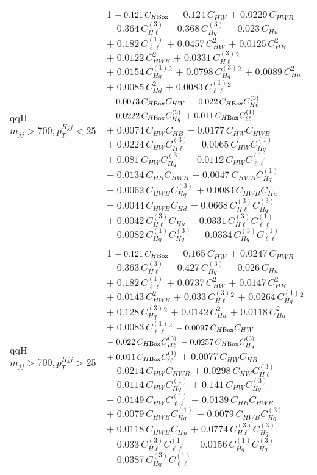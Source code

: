\begin{tabular}{l|p{}}
    qqH $m_{jj} > 700, p_{T}^{Hjj} < 25$ & 1 $+\;0.121\,C_{H\rm{Box}}$ $-\;0.124\,C_{HW}$ $+\;0.0229\,C_{HWB}$ $-\;0.364\,C^{(3)}_{H\ell}$ $-\;0.368\,C^{(3)}_{Hq}$ $-\;0.023\,C_{Hu}$ $+\;0.182\,C^{(1)}_{\ell\ell}$ $+\;0.0457\,C_{HW}^{2}$ $+\;0.0125\,C_{HB}^{2}$ $+\;0.0122\,C_{HWB}^{2}$ $+\;0.0331\,C^{(3)}_{H\ell}^{2}$ $+\;0.0154\,C^{(1)}_{Hq}^{2}$ $+\;0.0798\,C^{(3)}_{Hq}^{2}$ $+\;0.0089\,C_{Hu}^{2}$ $+\;0.0085\,C_{Hd}^{2}$ $+\;0.0083\,C^{(1)}_{\ell\ell}^{2}$ $-\;0.0073\,C_{H\rm{Box}}C_{HW}$ $-\;0.022\,C_{H\rm{Box}}C^{(3)}_{H\ell}$ $-\;0.0222\,C_{H\rm{Box}}C^{(3)}_{Hq}$ $+\;0.011\,C_{H\rm{Box}}C^{(1)}_{\ell\ell}$ $+\;0.0074\,C_{HW}C_{HB}$ $-\;0.0177\,C_{HW}C_{HWB}$ $+\;0.0224\,C_{HW}C^{(3)}_{H\ell}$ $-\;0.0065\,C_{HW}C^{(1)}_{Hq}$ $+\;0.081\,C_{HW}C^{(3)}_{Hq}$ $-\;0.0112\,C_{HW}C^{(1)}_{\ell\ell}$ $-\;0.0134\,C_{HB}C_{HWB}$ $+\;0.0047\,C_{HWB}C^{(1)}_{Hq}$ $-\;0.0062\,C_{HWB}C^{(3)}_{Hq}$ $+\;0.0083\,C_{HWB}C_{Hu}$ $-\;0.0044\,C_{HWB}C_{Hd}$ $+\;0.0668\,C^{(3)}_{H\ell}C^{(3)}_{Hq}$ $+\;0.0042\,C^{(3)}_{H\ell}C_{Hu}$ $-\;0.0331\,C^{(3)}_{H\ell}C^{(1)}_{\ell\ell}$ $-\;0.0082\,C^{(1)}_{Hq}C^{(3)}_{Hq}$ $-\;0.0334\,C^{(3)}_{Hq}C^{(1)}_{\ell\ell}$ \\
    qqH $m_{jj} > 700, p_{T}^{Hjj} > 25$ & 1 $+\;0.121\,C_{H\rm{Box}}$ $-\;0.165\,C_{HW}$ $+\;0.0247\,C_{HWB}$ $-\;0.363\,C^{(3)}_{H\ell}$ $-\;0.427\,C^{(3)}_{Hq}$ $-\;0.026\,C_{Hu}$ $+\;0.182\,C^{(1)}_{\ell\ell}$ $+\;0.0737\,C_{HW}^{2}$ $+\;0.0147\,C_{HB}^{2}$ $+\;0.0143\,C_{HWB}^{2}$ $+\;0.033\,C^{(3)}_{H\ell}^{2}$ $+\;0.0264\,C^{(1)}_{Hq}^{2}$ $+\;0.128\,C^{(3)}_{Hq}^{2}$ $+\;0.0142\,C_{Hu}^{2}$ $+\;0.0118\,C_{Hd}^{2}$ $+\;0.0083\,C^{(1)}_{\ell\ell}^{2}$ $-\;0.0097\,C_{H\rm{Box}}C_{HW}$ $-\;0.022\,C_{H\rm{Box}}C^{(3)}_{H\ell}$ $-\;0.0257\,C_{H\rm{Box}}C^{(3)}_{Hq}$ $+\;0.011\,C_{H\rm{Box}}C^{(1)}_{\ell\ell}$ $+\;0.0077\,C_{HW}C_{HB}$ $-\;0.0214\,C_{HW}C_{HWB}$ $+\;0.0298\,C_{HW}C^{(3)}_{H\ell}$ $-\;0.0114\,C_{HW}C^{(1)}_{Hq}$ $+\;0.141\,C_{HW}C^{(3)}_{Hq}$ $-\;0.0149\,C_{HW}C^{(1)}_{\ell\ell}$ $-\;0.0139\,C_{HB}C_{HWB}$ $+\;0.0079\,C_{HWB}C^{(1)}_{Hq}$ $-\;0.0079\,C_{HWB}C^{(3)}_{Hq}$ $+\;0.0118\,C_{HWB}C_{Hu}$ $+\;0.0774\,C^{(3)}_{H\ell}C^{(3)}_{Hq}$ $-\;0.033\,C^{(3)}_{H\ell}C^{(1)}_{\ell\ell}$ $-\;0.0156\,C^{(1)}_{Hq}C^{(3)}_{Hq}$ $-\;0.0387\,C^{(3)}_{Hq}C^{(1)}_{\ell\ell}$ \\
\end{tabular}